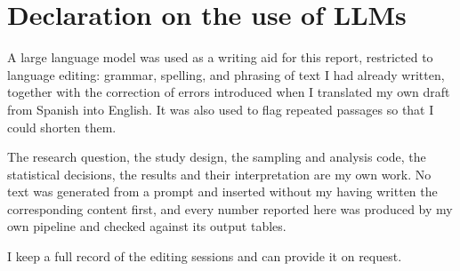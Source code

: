 \documentclass[11pt]{article}
\begin{document}
\section*{Declaration on the use of LLMs}

A large language model was used as a writing aid for this report, restricted to
language editing: grammar, spelling, and phrasing of text I had already written,
together with the correction of errors introduced when I translated my own draft
from Spanish into English. It was also used to flag repeated passages so that I
could shorten them.

The research question, the study design, the sampling and analysis code, the
statistical decisions, the results and their interpretation are my own work. No
text was generated from a prompt and inserted without my having written the
corresponding content first, and every number reported here was produced by my
own pipeline and checked against its output tables.

I keep a full record of the editing sessions and can provide it on request.



\end{document}
